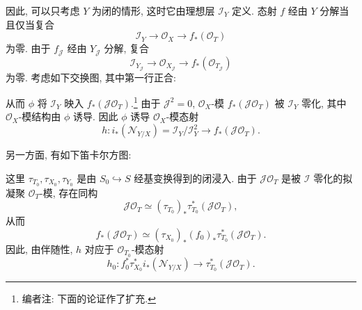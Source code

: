 因此, 可以只考虑 \(Y\) 为闭的情形, 这时它由理想层 \(\mathscr I_Y\) 定义.
态射 \(f\) 经由 \(Y\) 分解当且仅当复合
\[
 \mathscr I_Y\longrightarrow\mathscr O_X
 \longrightarrow f_*(\mathscr O_T)
\]
为零. 由于 \(f_{\mathscr J}\) 经由
\(Y_{\mathscr J}\) 分解, 复合
\[
 \mathscr I_{Y_{\mathscr J}}\longrightarrow
 \mathscr O_{X_{\mathscr J}}\longrightarrow
 f_*(\mathscr O_{T_{\mathscr J}})
\]
为零. 考虑如下交换图, 其中第一行正合:

\begin{center}
\end{center}

从而 \(\phi\) 将 \(\mathscr I_Y\) 映入
\(f_*(\mathscr J\mathscr O_T)\).\footnote{编者注: 下面的论证作了扩充.} 由于 \(\mathscr J^2=0\),
\(\mathscr O_X\)-模 \(f_*(\mathscr J\mathscr O_T)\) 被
\(\mathscr I_Y\) 零化, 其中 \(\mathscr O_X\)-模结构由 \(\phi\) 诱导.
因此 \(\phi\) 诱导 \(\mathscr O_X\)-模态射
\[
 h:i_*(\mathscr N_{Y/X})
   =\mathscr I_Y/\mathscr I_Y^2
 \longrightarrow f_*(\mathscr J\mathscr O_T).
\]

另一方面, 有如下笛卡尔方图:

\begin{center}
\end{center}

这里 \(\tau_{T_0},\tau_{X_0},\tau_{Y_0}\) 是由
\(S_0\hookrightarrow S\) 经基变换得到的闭浸入.
由于 \(\mathscr J\mathscr O_T\) 是被 \(\mathscr I\) 零化的拟凝聚
\(\mathscr O_T\)-模, 存在同构
\[
 \mathscr J\mathscr O_T
 \simeq
 (\tau_{T_0})_*\tau_{T_0}^*(\mathscr J\mathscr O_T),
\]
从而
\[
 f_*(\mathscr J\mathscr O_T)
 \simeq
 (\tau_{X_0})_*(f_0)_*\tau_{T_0}^*(\mathscr J\mathscr O_T).
\]
因此, 由伴随性, \(h\) 对应于 \(\mathscr O_{T_0}\)-模态射
\[
 h_0:
 f_0^*\tau_{X_0}^*i_*(\mathscr N_{Y/X})
 \longrightarrow
 \tau_{T_0}^*(\mathscr J\mathscr O_T).
\]
\smallskip
{}

